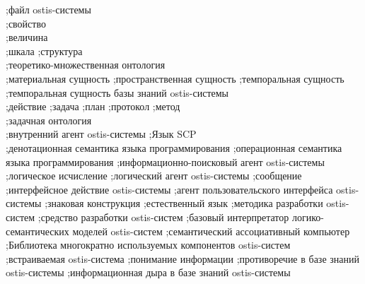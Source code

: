 {	
;файл ostis-системы\\
;свойство\\
;величина\\
;шкала
;структура\\
;теоретико-множественная онтология\\
;материальная сущность
;пространственная сущность
;темпоральная сущность\\
;темпоральная сущность базы знаний ostis-системы\\
;действие
;задача
;план
;протокол
;метод\\
;задачная онтология\\
;внутренний агент ostis-системы
;Язык SCP\\
;денотационная семантика языка программирования
;операционная семантика языка программирования
;информационно-поисковый агент ostis-системы
;логическое исчисление
;логический агент ostis-системы
;сообщение
;интерфейсное действие ostis-системы
;агент пользовательского интерфейса ostis-системы
;знаковая конструкция
;естественный язык
;методика разработки ostis-систем
;средство разработки ostis-систем
;базовый интерпретатор логико-семантических моделей ostis-систем
;семантический ассоциативный компьютер
;Библиотека многократно используемых компонентов ostis-систем\\
;встраиваемая ostis-система
;понимание информации
;противоречие в базе знаний ostis-системы
;информационная дыра в базе знаний ostis-системы\\
}

